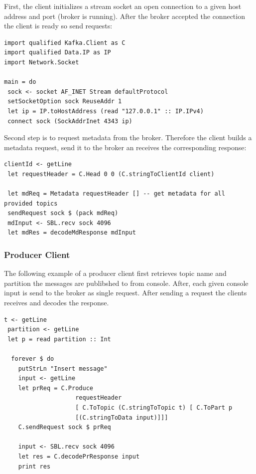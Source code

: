 First, the client initializes a stream socket an open connection to a given host
address and port (broker is running). After the broker accepted the connection
the client is ready so send requests:
\begin{lstlisting}[caption={Initialize client by connceting to broker}]
import qualified Kafka.Client as C 
import qualified Data.IP as IP
import Network.Socket

main = do 
 sock <- socket AF_INET Stream defaultProtocol 
 setSocketOption sock ReuseAddr 1
 let ip = IP.toHostAddress (read "127.0.0.1" :: IP.IPv4)
 connect sock (SockAddrInet 4343 ip)
\end{lstlisting}

Second step is to request metadata from the broker.
Therefore the client builds a metadata request, send it to the broker an receives the
corresponding response:
\begin{lstlisting}[caption={Retrieve metadata from broker}]
 clientId <- getLine
 let requestHeader = C.Head 0 0 (C.stringToClientId client)

 let mdReq = Metadata requestHeader [] -- get metadata for all provided topics
 sendRequest sock $ (pack mdReq)
 mdInput <- SBL.recv sock 4096
 let mdRes = decodeMdResponse mdInput
\end{lstlisting}

\subsubsection{Producer Client}
The following example of a producer client first retrieves topic name
and partition the messages are publibshed to from console. After, each given
console input is send to the broker as single request. After sending
a request the clients receives and decodes the response.
\begin{lstlisting}[caption={Producer client example}]
 t <- getLine
 partition <- getLine
 let p = read partition :: Int

  forever $ do 
    putStrLn "Insert message"
    input <- getLine
    let prReq = C.Produce 
                    requestHeader
                    [ C.ToTopic (C.stringToTopic t) [ C.ToPart p
                    [(C.stringToData input)]]]
    C.sendRequest sock $ prReq

    input <- SBL.recv sock 4096
    let res = C.decodePrResponse input
    print res
\end{lstlisting}

